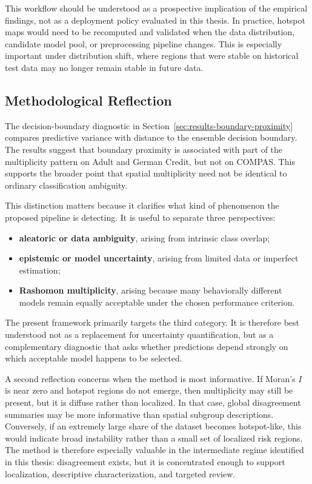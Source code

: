 This workflow should be understood as a prospective implication of the empirical findings,
not as a deployment policy evaluated in this thesis. In practice, hotspot maps would need
to be recomputed and validated when the data distribution, candidate model pool, or
preprocessing pipeline changes. This is especially important under distribution shift,
where regions that were stable on historical test data may no longer remain stable in
future data.

\subsection{Methodological Reflection}

The decision-boundary diagnostic in Section~\ref{sec:results-boundary-proximity}
compares predictive variance with distance to the ensemble decision boundary. The results suggest that
boundary proximity is associated with part of the multiplicity pattern on Adult and German Credit,
but not on COMPAS. This supports the broader point that spatial multiplicity need not be
identical to ordinary classification ambiguity.

This distinction matters because it clarifies what kind of phenomenon the proposed pipeline is detecting.
It is useful to separate three perspectives:
\begin{itemize}
    \item \textbf{aleatoric or data ambiguity}, arising from intrinsic class overlap;
    \item \textbf{epistemic or model uncertainty}, arising from limited data or imperfect estimation;
    \item \textbf{Rashomon multiplicity}, arising because many behaviorally different models remain 
    equally acceptable under the chosen performance criterion.
\end{itemize}
The present framework primarily targets the third category. It is therefore best understood not as 
a replacement for uncertainty quantification, but as a complementary diagnostic that asks whether 
predictions depend strongly on which acceptable model happens to be selected.

A second reflection concerns when the method is most informative. If Moran's $I$ is near zero and 
hotspot regions do not emerge, then multiplicity may still be present, but it is diffuse rather 
than localized. In that case, global disagreement summaries may be more informative than spatial 
subgroup descriptions. Conversely, if an extremely large share of the dataset becomes hotspot-like,
this would indicate broad instability rather than a small set of localized risk regions. The 
method is therefore especially valuable in the intermediate regime identified in this thesis: 
disagreement exists, but it is concentrated enough to support localization, descriptive 
characterization, and targeted review.

